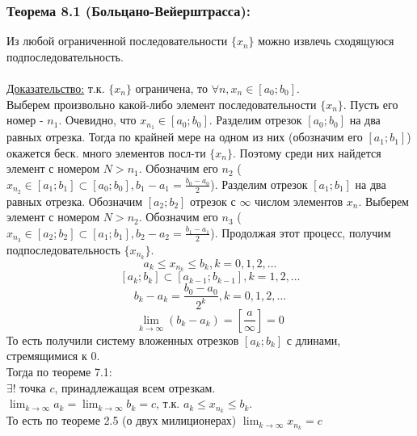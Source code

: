 \documentclass[12pt]{article}
\begin{document}
    \subsubsection*{Теорема 8.1 (Больцано-Вейерштрасса):}
    \indent Из любой ограниченной последовательности $\{x_n\}$ можно извлечь сходящуюся подпоследовательность.\\\\
    \underline{Доказательство:} т.к. $\{x_n\}$ ограничена, то $\forall n, x_n \in [a_{0}; b_{0}]$.\\
    Выберем произвольно какой-либо элемент последовательности $\{x_n\}$. Пусть его номер - $n_{1}$. Очевидно, что $x_{n_{1}} \in [a_{0}; b_{0}]$. Разделим отрезок $[a_{0}; b_{0}]$ на два равных отрезка. Тогда по крайней мере на одном из них (обозначим его $[a_{1}; b_{1}]$) окажется беск. много элементов посл-ти $\{x_n\}$. Поэтому среди них найдется элемент с номером $N > n_{1}$. Обозначим его $n_{2}$ ($x_{n_{2}} \in [a_{1}; b_{1}] \subset [a_{0}; b_{0}], b_{1} - a_{1} = \frac{b_{0} - a_{0}}{2}$). Разделим отрезок $[a_{1}; b_{1}]$ на два равных отрезка. Обозначим $[a_{2}; b_{2}]$ отрезок с $\infty$ числом элементов $x_n$. Выберем элемент с номером $N > n_{2}$. Обозначим его $n_{3}$ ($x_{n_{3}} \in [a_{2}; b_{2}] \subset [a_{1}; b_{1}], b_{2} - a_{2} = \frac{b_{1} - a_{1}}{2}$). Продолжая этот процесс, получим подпоследовательность $\{x_{n_{k}}\}$.\\
    \[a_{k} \le x_{n_{k}} \le b_{k}, k = 0, 1, 2, \dots\]
    \[[a_{k}; b_{k}] \subset [a_{k-1}; b_{k-1}], k = 1, 2, \dots\]
    \[b_{k} - a_{k} = \frac{b_{0} - a_{0}}{2^{k}}, k = 0,1,2,\dots\]
    \[\lim_{k\to\infty}(b_{k}-a_{k}) = [\frac{a}{\infty}] = 0\]
    То есть получили систему вложенных отрезков $[a_{k}; b_{k}]$ с длинами, стремящимися к $0$.\\
    Тогда по теореме 7.1:\\
    \indent $\exists !$ точка $c$, принадлежащая всем отрезкам.\\
    \indent $\lim_{k\to\infty}a_{k} = \lim_{k\to\infty}b_{k} = c$, т.к. $a_{k} \le x_{n_{k}} \le b_{k}$.\\
    \indent То есть по теореме 2.5 (о двух милиционерах) $\lim_{k\to\infty}x_{n_{k}} = c$\\
\end{document}
